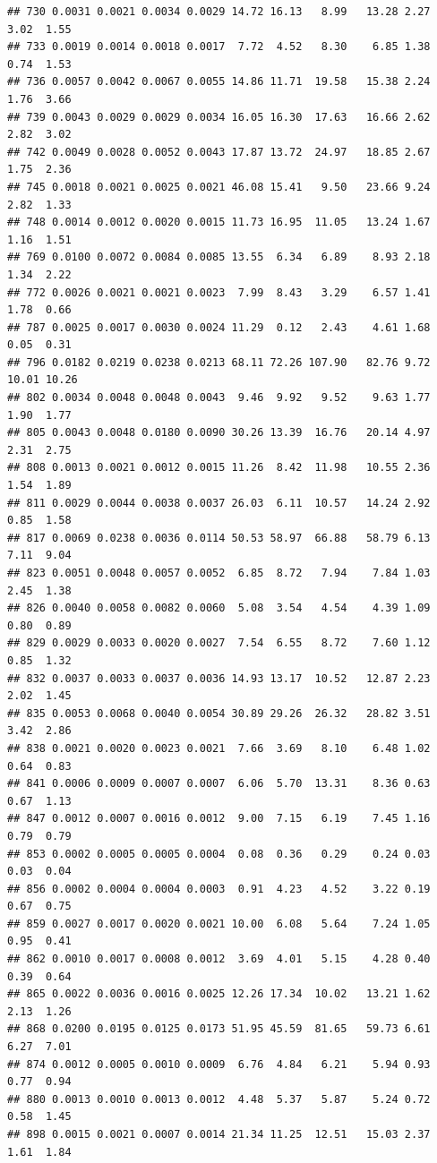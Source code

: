 \documentclass[]{article}
\begin{document}
\begin{verbatim}
## 730 0.0031 0.0021 0.0034 0.0029 14.72 16.13   8.99   13.28 2.27  3.02  1.55
## 733 0.0019 0.0014 0.0018 0.0017  7.72  4.52   8.30    6.85 1.38  0.74  1.53
## 736 0.0057 0.0042 0.0067 0.0055 14.86 11.71  19.58   15.38 2.24  1.76  3.66
## 739 0.0043 0.0029 0.0029 0.0034 16.05 16.30  17.63   16.66 2.62  2.82  3.02
## 742 0.0049 0.0028 0.0052 0.0043 17.87 13.72  24.97   18.85 2.67  1.75  2.36
## 745 0.0018 0.0021 0.0025 0.0021 46.08 15.41   9.50   23.66 9.24  2.82  1.33
## 748 0.0014 0.0012 0.0020 0.0015 11.73 16.95  11.05   13.24 1.67  1.16  1.51
## 769 0.0100 0.0072 0.0084 0.0085 13.55  6.34   6.89    8.93 2.18  1.34  2.22
## 772 0.0026 0.0021 0.0021 0.0023  7.99  8.43   3.29    6.57 1.41  1.78  0.66
## 787 0.0025 0.0017 0.0030 0.0024 11.29  0.12   2.43    4.61 1.68  0.05  0.31
## 796 0.0182 0.0219 0.0238 0.0213 68.11 72.26 107.90   82.76 9.72 10.01 10.26
## 802 0.0034 0.0048 0.0048 0.0043  9.46  9.92   9.52    9.63 1.77  1.90  1.77
## 805 0.0043 0.0048 0.0180 0.0090 30.26 13.39  16.76   20.14 4.97  2.31  2.75
## 808 0.0013 0.0021 0.0012 0.0015 11.26  8.42  11.98   10.55 2.36  1.54  1.89
## 811 0.0029 0.0044 0.0038 0.0037 26.03  6.11  10.57   14.24 2.92  0.85  1.58
## 817 0.0069 0.0238 0.0036 0.0114 50.53 58.97  66.88   58.79 6.13  7.11  9.04
## 823 0.0051 0.0048 0.0057 0.0052  6.85  8.72   7.94    7.84 1.03  2.45  1.38
## 826 0.0040 0.0058 0.0082 0.0060  5.08  3.54   4.54    4.39 1.09  0.80  0.89
## 829 0.0029 0.0033 0.0020 0.0027  7.54  6.55   8.72    7.60 1.12  0.85  1.32
## 832 0.0037 0.0033 0.0037 0.0036 14.93 13.17  10.52   12.87 2.23  2.02  1.45
## 835 0.0053 0.0068 0.0040 0.0054 30.89 29.26  26.32   28.82 3.51  3.42  2.86
## 838 0.0021 0.0020 0.0023 0.0021  7.66  3.69   8.10    6.48 1.02  0.64  0.83
## 841 0.0006 0.0009 0.0007 0.0007  6.06  5.70  13.31    8.36 0.63  0.67  1.13
## 847 0.0012 0.0007 0.0016 0.0012  9.00  7.15   6.19    7.45 1.16  0.79  0.79
## 853 0.0002 0.0005 0.0005 0.0004  0.08  0.36   0.29    0.24 0.03  0.03  0.04
## 856 0.0002 0.0004 0.0004 0.0003  0.91  4.23   4.52    3.22 0.19  0.67  0.75
## 859 0.0027 0.0017 0.0020 0.0021 10.00  6.08   5.64    7.24 1.05  0.95  0.41
## 862 0.0010 0.0017 0.0008 0.0012  3.69  4.01   5.15    4.28 0.40  0.39  0.64
## 865 0.0022 0.0036 0.0016 0.0025 12.26 17.34  10.02   13.21 1.62  2.13  1.26
## 868 0.0200 0.0195 0.0125 0.0173 51.95 45.59  81.65   59.73 6.61  6.27  7.01
## 874 0.0012 0.0005 0.0010 0.0009  6.76  4.84   6.21    5.94 0.93  0.77  0.94
## 880 0.0013 0.0010 0.0013 0.0012  4.48  5.37   5.87    5.24 0.72  0.58  1.45
## 898 0.0015 0.0021 0.0007 0.0014 21.34 11.25  12.51   15.03 2.37  1.61  1.84

\end{verbatim}
\end{document}
